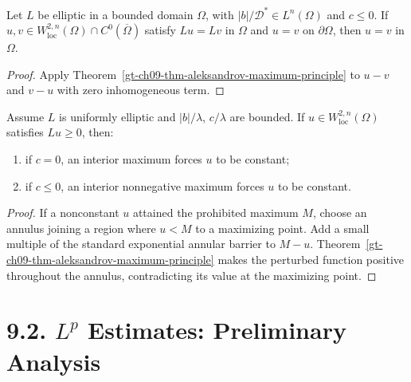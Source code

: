 \begin{theorem}
\label{gt-ch09-thm-strong-dirichlet-uniqueness}
Let $L$ be elliptic in a bounded domain $\Omega$, with
$|b|/\mathcal D^*\in L^n(\Omega)$ and $c\le0$.  If
$u,v\in W^{2,n}_{\mathrm{loc}}(\Omega)\cap C^0(\overline\Omega)$ satisfy
$Lu=Lv$ in $\Omega$ and $u=v$ on $\partial\Omega$, then $u=v$ in $\Omega$.
\end{theorem}
\begin{proof}
\sketch Apply Theorem~\ref{gt-ch09-thm-aleksandrov-maximum-principle} to
$u-v$ and $v-u$ with zero inhomogeneous term.
\end{proof}

\begin{theorem}
\label{gt-ch09-thm-strong-maximum-principle}
Assume $L$ is uniformly elliptic and $|b|/\lambda$, $c/\lambda$ are bounded.
If $u\in W^{2,n}_{\mathrm{loc}}(\Omega)$ satisfies $Lu\ge0$, then:
\begin{enumerate}
\item[(i)] if $c=0$, an interior maximum forces $u$ to be constant;
\item[(ii)] if $c\le0$, an interior nonnegative maximum forces $u$ to be
constant.
\end{enumerate}
\end{theorem}
\begin{proof}
\sketch If a nonconstant $u$ attained the prohibited maximum $M$, choose an
annulus joining a region where $u<M$ to a maximizing point.  Add a small
multiple of the standard exponential annular barrier to $M-u$.
Theorem~\ref{gt-ch09-thm-aleksandrov-maximum-principle} makes the perturbed
function positive throughout the annulus, contradicting its value at the
maximizing point.
\end{proof}

\section*{9.2. $L^p$ Estimates: Preliminary Analysis}

